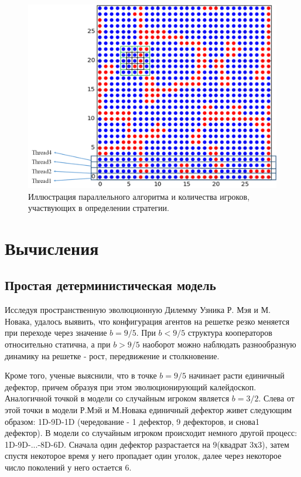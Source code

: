 \documentclass[a4paper]{article}
\begin{document}
	\begin{figure}[H]
		\centering
		\includegraphics[width=0.7\linewidth]{rule.png}
		\caption{Иллюстрация параллельного алгоритма и количества игроков, участвующих в
			 определении стратегии.}
		\label{parall}		
	\end{figure}
	
	\section{Вычисления}
	
	\subsection{Простая детерминистическая модель}
	
	\par Исследуя пространственную эволюционную Дилемму Узника Р. Мэя и М. Новака, удалось выявить, что конфигурация агентов на решетке резко меняется при переходе через значение $b = 9/5$. При $b<9/5$ структура кооператоров относительно статична, а при $b>9/5$ наоборот можно наблюдать разнообразную динамику на решетке - рост, передвижение и столкновение.
	
	\par Кроме того, ученые выяснили, что в точке $b=9/5$ начинает расти единичный дефектор, причем образуя при этом эволюционирующий калейдоскоп. Аналогичной точкой в модели со случайным игроком является $b=3/2$. Слева от этой точки в модели Р.Мэй и М.Новака единичный дефектор живет следующим образом: 1D-9D-1D (чередование - 1 дефектор, 9 дефекторов, и снова1 дефектор). В модели со случайным игроком происходит немного другой процесс: 1D-9D-...-8D-6D. Сначала один дефектор разрастается на 9(квадрат 3х3), затем спустя некоторое время у него пропадает один уголок, далее через некоторое число поколений у него остается 6.
	
\end{document}
